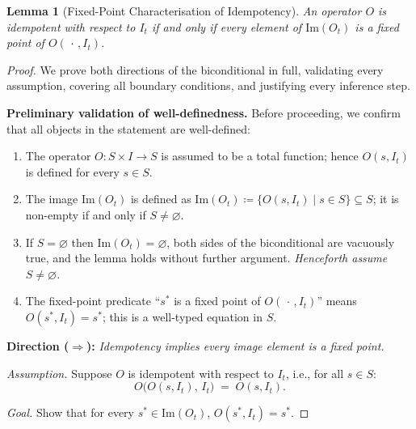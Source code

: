 \documentclass[12pt,openany]{book}
\newcommand{\calI}{\mathcal{I}}
\numberwithin{equation}{chapter}
\theoremstyle{plain}
\newtheorem{lemma}[theorem]{Lemma}
\theoremstyle{definition}
\theoremstyle{remark}
\numberwithin{equation}{chapter}
\theoremstyle{plain}
\newcommand{\calS}{\mathcal{S}}
\def\calI{I}%
\def\calS{S}%
\begin{document}
\begin{lemma}[Fixed-Point Characterisation of Idempotency]
\label{lem:idemp-fixpoint}
An operator $O$ is idempotent with respect to $\calI_t$ if and only if
every element of $\mathrm{Im}(O_t)$ is a fixed point of $O(\,\cdot\,,
\calI_t)$.
\end{lemma}

\begin{proof}
We prove both directions of the biconditional in full, validating every
assumption, covering all boundary conditions, and justifying every
inference step.

\medskip
\noindent\textbf{Preliminary validation of well-definedness.}
Before proceeding, we confirm that all objects in the statement are
well-defined:
\begin{enumerate}
  \item The operator $O : \calS \times \calI \to \calS$ is assumed to be
        a total function; hence $O(s, \calI_t)$ is defined for every
        $s \in \calS$.
  \item The image $\mathrm{Im}(O_t)$ is defined as
        $\mathrm{Im}(O_t) \coloneqq \{ O(s, \calI_t) \mid s \in \calS
        \} \subseteq \calS$; it is non-empty if and only if $\calS \neq
        \varnothing$.
  \item If $\calS = \varnothing$ then $\mathrm{Im}(O_t) = \varnothing$,
        both sides of the biconditional are vacuously true, and the
        lemma holds without further argument.  \emph{Henceforth assume
        $\calS \neq \varnothing$.}
  \item The fixed-point predicate ``$s^*$ is a fixed point of
        $O(\,\cdot\,,\calI_t)$'' means $O(s^*, \calI_t) = s^*$; this
        is a well-typed equation in $\calS$.
\end{enumerate}

\medskip
\noindent\textbf{Direction ($\Rightarrow$):}
\emph{Idempotency implies every image element is a fixed point.}

\medskip
\noindent\emph{Assumption.}  Suppose $O$ is idempotent with respect to
$\calI_t$, i.e., for all $s \in \calS$:
\begin{equation}
  O\!\bigl(O(s,\calI_t),\,\calI_t\bigr) \;=\; O(s,\calI_t).
  \label{eq:idemp-fwd-hyp}
\end{equation}

\noindent\emph{Goal.}  Show that for every $s^* \in \mathrm{Im}(O_t)$,
$O(s^*, \calI_t) = s^*$.


\end{proof}
\end{document}
